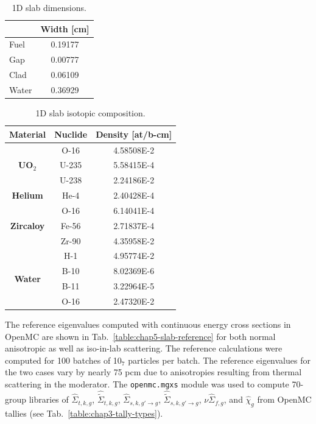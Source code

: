 \begin{table}[h!]
  \centering
  \caption[1D slab dimensions]{1D slab dimensions.}
  \small
  \label{table:chap5-slab-widths} 
  \vspace{6pt}
  \begin{tabular}{l c}
  \toprule
  \rowcolor{lightgray}
  \multicolumn{1}{c}{\bf Material} &
  \multicolumn{1}{c}{\bf Width [cm]} \\
  \midrule
  Fuel &  0.19177 \\
  Gap &   0.00777 \\
  Clad &  0.06109 \\
  Water & 0.36929 \\
  \bottomrule
\end{tabular}
\end{table}

\begin{table}[h!]
  \centering
  \caption[1D slab isotopic composition]{1D slab isotopic composition.}
  \small
  \label{table:chap5-slab-isotopes} 
  \vspace{6pt}
  \begin{tabular}{c c c}
  \toprule
  \rowcolor{lightgray}
  {\bf Material} &
  {\bf Nuclide} &
  {\bf Density [at/b-cm]} \\
  \midrule
  \multirow{3}{*}{\bf UO$_2$} & O-16 &  4.58508E-2 \\
  & U-235 & 5.58415E-4 \\
  & U-238 & 2.24186E-2 \\
  \midrule
  \multirow{1}{*}{\bf Helium} & He-4 & 2.40428E-4 \\
  \midrule
  \multirow{3}{*}{\bf Zircaloy} & O-16 &  6.14041E-4 \\
  & Fe-56 & 2.71837E-4 \\
  & Zr-90 & 4.35958E-2 \\
  \midrule
  \multirow{4}{*}{\bf Water} & H-1 &  4.95774E-2 \\
  & B-10 & 8.02369E-6 \\
  & B-11 & 3.22964E-5 \\
  & O-16 & 2.47320E-2 \\
  \bottomrule
\end{tabular}
\end{table}

The reference eigenvalues computed with continuous energy cross sections in OpenMC are shown in Tab.~\ref{table:chap5-slab-reference} for both normal anisotropic as well as iso-in-lab scattering. The reference calculations were computed for 100 batches of 10$_{7}$ particles per batch. The reference eigenvalues for the two cases vary by nearly 75 \ac{pcm} due to anisotropies resulting from thermal scattering in the moderator. The \texttt{openmc.mgxs} module was used to compute 70-group libraries of $\hat{\Sigma}_{t,k,g}$, $\hat{\tilde{\Sigma}}_{t,k,g}$, $\hat{\Sigma}_{s,k,g'\rightarrow g}$, $\hat{\tilde{\Sigma}}_{s,k,g'\rightarrow g}$, $\nu\hat{\Sigma}_{f,g}$, and $\hat{\chi}_{g}$ from OpenMC tallies (see Tab.~\ref{table:chap3-tally-types}).

